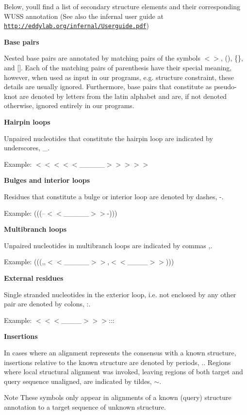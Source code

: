 Below, you\textquotesingle{}ll find a list of secondary structure elements and their corresponding W\+U\+SS annotation (See also the infernal user guide at \href{http://eddylab.org/infernal/Userguide.pdf}{\tt http\+://eddylab.\+org/infernal/\+Userguide.\+pdf})


\begin{DoxyItemize}
\item {\bfseries Base pairs}

Nested base pairs are annotated by matching pairs of the symbols {\ttfamily $<$$>$}, {\ttfamily ()}, {\ttfamily \{\}}, and {\ttfamily \mbox{[}\mbox{]}}. Each of the matching pairs of parenthesis have their special meaning, however, when used as input in our programs, e.\+g. structure constraint, these details are usually ignored. Furthermore, base pairs that constitute as pseudo-\/knot are denoted by letters from the latin alphabet and are, if not denoted otherwise, ignored entirely in our programs.
\item {\bfseries Hairpin loops}

Unpaired nucleotides that constitute the hairpin loop are indicated by underscores, {\ttfamily \+\_\+}.

Example\+: {\ttfamily $<$$<$$<$$<$$<$\+\_\+\+\_\+\+\_\+\+\_\+\+\_\+$>$$>$$>$$>$$>$}
\item {\bfseries Bulges and interior loops}

Residues that constitute a bulge or interior loop are denoted by dashes, {\ttfamily -\/}.

Example\+: {\ttfamily (((--$<$$<$\+\_\+\+\_\+\+\_\+\+\_\+\+\_\+$>$$>$-\/)))}
\item {\bfseries Multibranch loops}

Unpaired nucleotides in multibranch loops are indicated by commas {\ttfamily ,}.

Example\+: {\ttfamily (((,,$<$$<$\+\_\+\+\_\+\+\_\+\+\_\+\+\_\+$>$$>$,$<$$<$\+\_\+\+\_\+\+\_\+\+\_\+$>$$>$)))}
\item {\bfseries External residues}

Single stranded nucleotides in the exterior loop, i.\+e. not enclosed by any other pair are denoted by colons, {\ttfamily \+:}.

Example\+: {\ttfamily $<$$<$$<$\+\_\+\+\_\+\+\_\+\+\_\+$>$$>$$>$\+:\+:\+:}
\item {\bfseries Insertions}

In cases where an alignment represents the consensus with a known structure, insertions relative to the known structure are denoted by periods, {\ttfamily .}. Regions where local structural alignment was invoked, leaving regions of both target and query sequence unaligned, are indicated by tildes, {\ttfamily $\sim$}. \begin{DoxyNote}{Note}
These symbols only appear in alignments of a known (query) structure annotation to a target sequence of unknown structure.
\end{DoxyNote}


\end{DoxyItemize}
